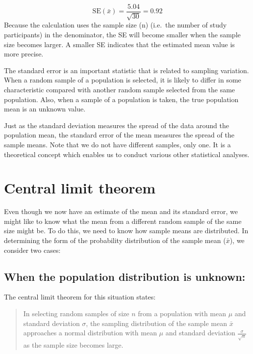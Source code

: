 \documentclass[
]{memoir}
\begin{document}
\[ \text{SE}(\bar{x}) = \frac{\text{5.04}}{\sqrt{30}} = 0.92 \]
Because the calculation uses the sample size (n) (i.e.~the number of study participants) in the denominator, the SE will become smaller when the sample size becomes larger. A smaller SE indicates that the estimated mean value is more precise.

The standard error is an important statistic that is related to sampling variation. When a random sample of a population is selected, it is likely to differ in some characteristic compared with another random sample selected from the same population. Also, when a sample of a population is taken, the true population mean is an unknown value.

Just as the standard deviation measures the spread of the data around the population mean, the standard error of the mean measures the spread of the sample means. Note that we do not have different samples, only one. It is a theoretical concept which enables us to conduct various other statistical analyses.

\hypertarget{central-limit-theorem}{%
\section{Central limit theorem}\label{central-limit-theorem}}

Even though we now have an estimate of the mean and its standard error, we might like to know what the mean from a different random sample of the same size might be. To do this, we need to know how sample means are distributed. In determining the form of the probability distribution of the sample mean (\(\bar{x}\)), we consider two cases:

\hypertarget{when-the-population-distribution-is-unknown}{%
\subsection{When the population distribution is unknown:}\label{when-the-population-distribution-is-unknown}}

The central limit theorem for this situation states:

\begin{quote}
In selecting random samples of size \(n\) from a population with mean \(\mu\) and standard deviation \(\sigma\), the sampling distribution of the sample mean \(\bar{x}\) approaches a normal distribution with mean \(\mu\) and standard deviation \(\tfrac{\sigma}{\sqrt{n}}\) as the sample size becomes large.
\end{quote}
\end{document}

